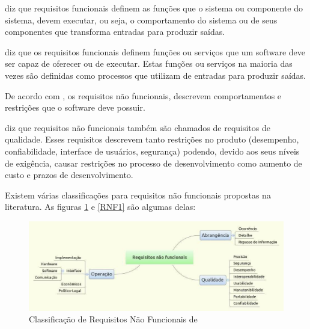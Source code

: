 
 diz que requisitos funcionais definem as funções que o sistema ou componente do sistema, devem executar, ou seja, o comportamento do sistema ou de seus componentes que transforma entradas para produzir saídas.

 diz que os requisitos funcionais definem funções ou serviços que um software deve ser capaz de oferecer ou de executar. Estas funções ou serviços na maioria das vezes são definidas como processos que utilizam de entradas para produzir saídas.

De acordo com , os requisitos não funcionais, descrevem comportamentos e restrições que o software deve possuir. 

 diz que requisitos não funcionais também são chamados de requisitos de qualidade. Esses requisitos descrevem tanto restrições no produto (desempenho, confiabilidade, interface de usuários, segurança) podendo, devido aos seus níveis de exigência, causar restrições no processo de desenvolvimento como aumento de custo e prazos de desenvolvimento.


Existem várias classificações para requisitos não funcionais propostas na literatura. As figuras \ref{RNF} e \ref{RNF1} são algumas delas:

\begin{figure}[h]
\centering
\includegraphics[keepaspectratio=true,scale=0.35]{figuras/RNF1.jpg}
\caption{Classificação de Requisitos Não Funcionais de \cite{mamani}}
\label{RNF}
\end{figure}


